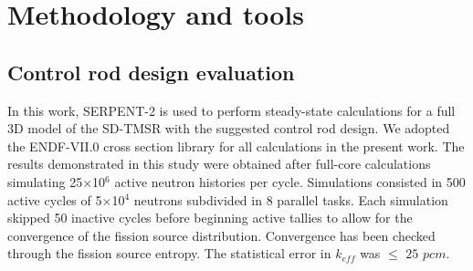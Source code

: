 \section{Methodology and tools} \label{Methodology-and-tools}
\subsection{Control rod design evaluation}
In this work, SERPENT-2 \cite{leppanen2014serpent} is used to 
perform steady-state calculations for a full 3D model of the SD-TMSR with 
the suggested control rod design. We adopted the ENDF-VII.0 cross section library 
for all calculations in the present work. The results demonstrated in this study were obtained after full-core calculations simulating 25$\times$10$^6$ active neutron histories per cycle. Simulations consisted in 500 active cycles of 5$\times$10$^4$ neutrons subdivided in 8 parallel tasks. Each simulation skipped 50 inactive cycles before beginning active tallies to allow for the convergence of the fission source distribution. Convergence has been checked through the fission source entropy. The statistical error in $k_{eff}$ was $\leq$ $25$ $pcm$.

%
%
%
%
%
%

